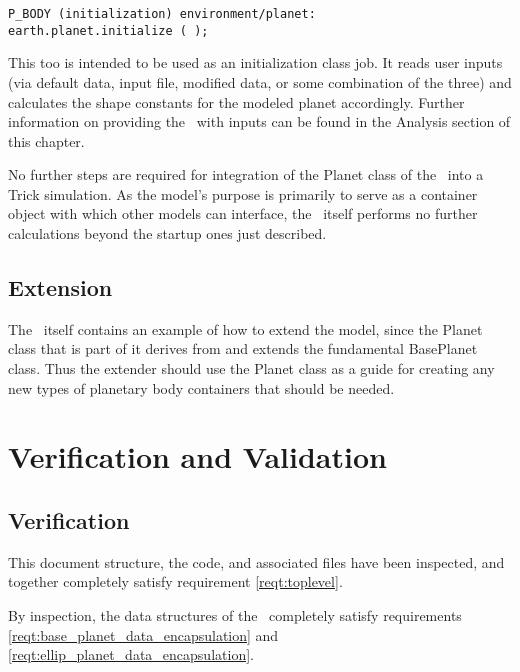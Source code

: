 \begin{verbatim}
P_BODY (initialization) environment/planet:
earth.planet.initialize ( );
\end{verbatim}

This too is intended to be used as an initialization class job. It reads user
inputs (via default data, input file, modified data, or some combination of the
three) and calculates the shape constants for the modeled planet accordingly.
Further information on providing the \planetDesc\ with inputs can be found in
the Analysis section of this chapter.

No further steps are required for integration of the Planet class of the
\planetDesc\ into a Trick simulation.  As the model's purpose is primarily to
serve as a container object with which other models can interface, the
\planetDesc\ itself performs no further calculations beyond the startup ones
just described.


\section{Extension}

The \planetDesc\ itself contains an example of how to extend the model, since
the Planet class that is part of it derives from and extends the fundamental
BasePlanet class. Thus the extender should use the Planet class as a guide for
creating any new types of planetary body containers that should be needed.



\chapter{Verification and Validation}\label{ch:ivv}

\section{Verification}

\label{inspect:TLI}
This document structure, the code, and associated files have been inspected,
and together completely satisfy requirement \ref{reqt:toplevel}.

\label{inspect:data_reqts}
By inspection, the data structures of the \planetDesc\ completely satisfy 
requirements \ref{reqt:base_planet_data_encapsulation} and
\ref{reqt:ellip_planet_data_encapsulation}.

